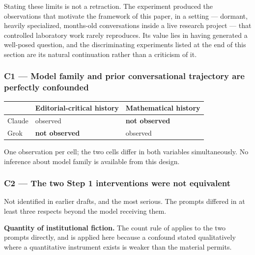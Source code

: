 Stating these limits is not a retraction. The experiment produced the observations that motivate the framework of this paper, in a setting — dormant, heavily specialized, months-old conversations inside a live research project — that controlled laboratory work rarely reproduces. Its value lies in having generated a well-posed question, and the discriminating experiments listed at the end of this section are its natural continuation rather than a criticism of it.


\subsubsection*{C1 — Model family and prior conversational trajectory are perfectly confounded}
\label{sec:en:x-c1-model-family-and-prior-conversational}

\begin{center}
\small
\begin{tabularx}{\linewidth}{>{\raggedright\arraybackslash}X>{\raggedright\arraybackslash}X>{\raggedright\arraybackslash}X}
\toprule
 & \textbf{Editorial-critical history} & \textbf{Mathematical history} \\
\midrule
Claude & observed & \textbf{not observed} \\
Grok & \textbf{not observed} & observed \\
\bottomrule
\end{tabularx}
\end{center}
One observation per cell; the two cells differ in both variables simultaneously. No inference about model family is available from this design.


\subsubsection*{C2 — The two Step 1 interventions were not equivalent}
\label{sec:en:x-c2-the-two-step-1-interventions-were-not}

Not identified in earlier drafts, and the most serious. The prompts differed in at least three respects beyond the model receiving them.

\textbf{Quantity of institutional fiction.} The count rule of  applies to the two prompts directly, and is applied here because a confound stated qualitatively where a quantitative instrument exists is weaker than the material permits.

